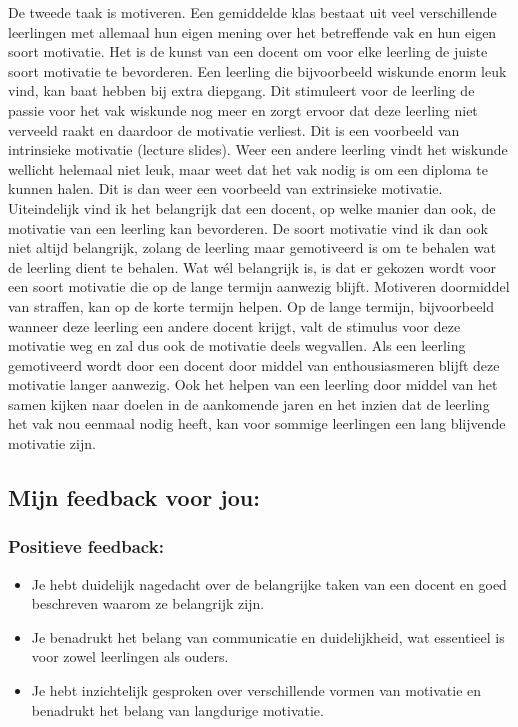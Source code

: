 \documentclass{article}
\begin{document}
{                De tweede taak is motiveren. Een gemiddelde klas bestaat uit veel verschillende leerlingen met allemaal hun eigen mening over het betreffende vak en hun eigen soort motivatie. Het is de kunst van een docent om voor elke leerling de juiste soort motivatie te bevorderen. Een leerling die bijvoorbeeld wiskunde enorm leuk vind, kan baat hebben bij extra diepgang. Dit stimuleert voor de leerling de passie voor het vak wiskunde nog meer en zorgt ervoor dat deze leerling niet verveeld raakt en daardoor de motivatie verliest. Dit is een voorbeeld van intrinsieke motivatie (lecture slides).
                Weer een andere leerling vindt het wiskunde wellicht helemaal niet leuk, maar weet dat het vak nodig is om een diploma te kunnen halen. Dit is dan weer een voorbeeld van extrinsieke motivatie. 
                Uiteindelijk vind ik het belangrijk dat een docent, op welke manier dan ook, de motivatie van een leerling kan bevorderen. De soort motivatie vind ik dan ook niet altijd belangrijk, zolang de leerling maar gemotiveerd is om te behalen wat de leerling dient te behalen. Wat wél belangrijk is, is dat er gekozen wordt voor een soort motivatie die op de lange termijn aanwezig blijft. Motiveren doormiddel van straffen, kan op de korte termijn helpen. Op de lange termijn, bijvoorbeeld wanneer deze leerling een andere docent krijgt, valt de stimulus voor deze motivatie weg en zal dus ook de motivatie deels wegvallen. Als een leerling gemotiveerd wordt door een docent door middel van enthousiasmeren blijft deze motivatie langer aanwezig. Ook het helpen van een leerling door middel van het samen kijken naar doelen in de aankomende jaren en het inzien dat de leerling het vak nou eenmaal nodig heeft, kan voor sommige leerlingen een lang blijvende motivatie zijn.}

        \bigskip

        \subsection*{Mijn feedback voor jou:}
            \subsubsection*{Positieve feedback:}
                \begin{itemize}
                    \item Je hebt duidelijk nagedacht over de belangrijke taken van een docent en goed beschreven waarom ze belangrijk zijn.
                    \item Je benadrukt het belang van communicatie en duidelijkheid, wat essentieel is voor zowel leerlingen als ouders.
                    \item Je hebt inzichtelijk gesproken over verschillende vormen van motivatie en benadrukt het belang van langdurige motivatie.
                \end{itemize}
                \bigskip
\end{document}
